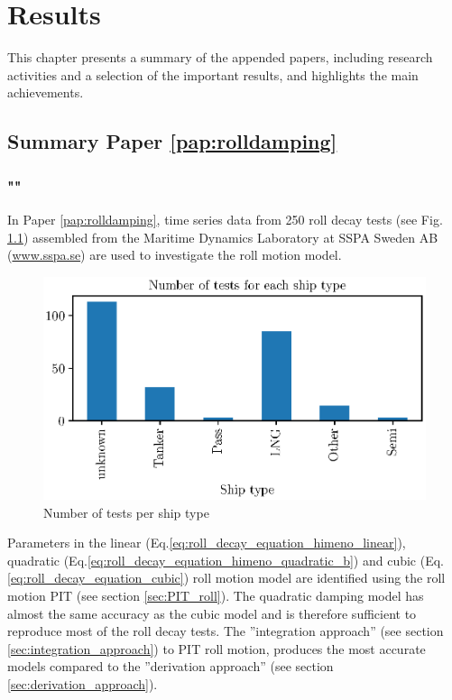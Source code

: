\chapter{Results\label{ch:results}}
This chapter presents a summary of the appended papers, including research activities
and a selection of the important results, and highlights the main achievements.

\section{Summary Paper \ref{pap:rolldamping}}
\subsection*{""}
In Paper \ref{pap:rolldamping}, time series data from 250 roll decay tests (see Fig. \ref{fig:ship_types}) assembled from the Maritime Dynamics Laboratory at SSPA Sweden AB (\href{www.sspa.se}{www.sspa.se}) are used to investigate the roll motion model. 

\begin{figure}[H]
    \centering
    \includegraphics[width=0.5\columnwidth]{kappa/images/ship_types.eps}
    \caption{Number of tests per ship type}
    \label{fig:ship_types}
\end{figure}

\noindent Parameters in the linear (Eq.\ref{eq:roll_decay_equation_himeno_linear}), quadratic (Eq.\ref{eq:roll_decay_equation_himeno_quadratic_b}) and cubic (Eq.\ref{eq:roll_decay_equation_cubic}) roll motion model are identified using the roll motion PIT (see section \ref{sec:PIT_roll}). The quadratic damping model has almost the same accuracy as the cubic model and is therefore sufficient to reproduce most of the roll decay tests. The ''integration approach'' (see section \ref{sec:integration_approach}) to PIT roll motion, produces the most accurate models compared to the ''derivation approach'' (see section \ref{sec:derivation_approach}).

